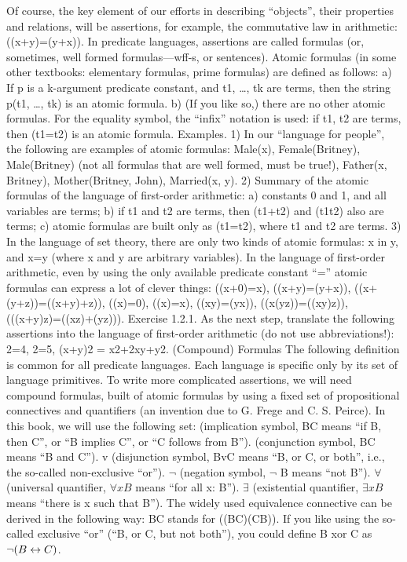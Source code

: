 Of course, the key element of our efforts in describing ``objects'', their properties and relations, will be
assertions, for example, the commutative law in arithmetic: ((x+y)=(y+x)). In predicate languages,
assertions are called formulas (or, sometimes, well formed formulas---wff-s, or sentences).
Atomic formulas (in some other textbooks: elementary formulas, prime formulas) are defined as follows:
a) If p is a k-argument predicate constant, and t1, \ldots , tk are terms, then the string p(t1, \ldots , tk) is an atomic
formula.
b) (If you like so,) there are no other atomic formulas.
For the equality symbol, the ``infix'' notation is used: if t1, t2 are terms, then (t1=t2) is an atomic formula.
Examples. 1) In our ``language for people'', the following are examples of atomic formulas: Male(x), Female(Britney),
Male(Britney) (not all formulas that are well formed, must be true!), Father(x, Britney), Mother(Britney, John), Married(x, y).
2) Summary of the atomic formulas of the language of first-order arithmetic: a) constants 0 and 1, and all variables are terms;
b) if t1 and t2 are terms, then (t1+t2) and (t1\cdot t2) also are terms; c) atomic formulas are built only as (t1=t2), where t1 and t2 are
terms.
3) In the language of set theory, there are only two kinds of atomic formulas: x in y, and x=y (where x and y are arbitrary
variables).
In the language of first-order arithmetic, even by using the only available predicate constant ``='' atomic
formulas can express a lot of clever things:
((x+0)=x), ((x+y)=(y+x)), ((x+(y+z))=((x+y)+z)),
((x)=0), ((x)=x), ((x\cdot y)=(y\cdot x)), ((x\cdot (y\cdot z))=((x\cdot y)\cdot z)),
(((x+y)\cdot z)=((x\cdot z)+(y\cdot z))).
Exercise 1.2.1. As the next step, translate the following assertions into the language of first-order
arithmetic (do not use abbreviations!): 2=4, 2=5, (x+y)2 = x2+2xy+y2.
(Compound) Formulas
The following definition is common for all predicate languages. Each language is specific only by its
set of language primitives.
To write more complicated assertions, we will need compound formulas, built of atomic formulas by
using a fixed set of propositional connectives and quantifiers (an invention due to G. Frege and C. S.
Peirce). In this book, we will use the following set:
\IMPLIES  (implication symbol, B\IMPLIES C means ``if B, then C'', or ``B implies C'', or ``C follows from B'').
\AND  (conjunction symbol, B\AND C means ``B and C'').
v (disjunction symbol, BvC means ``B, or C, or both'', i.e., the so-called non-exclusive ``or'').
\(\neg\)  (negation symbol, \(\neg\) B means ``not B'').
\(\forall\)  (universal quantifier, \(\forall xB\) means ``for all x: B'').
\(\exists\)  (existential quantifier, \(\exists xB\) means ``there is x such that B'').
The widely used equivalence connective \IFF  can be derived in the following way: B\IFF C stands for
((B\IMPLIES C)\AND (C\IMPLIES B)). If you like using the so-called exclusive ``or'' (``B, or C, but not both''), you could
define B xor C as \(\neg (B\leftrightarrow C)\).

